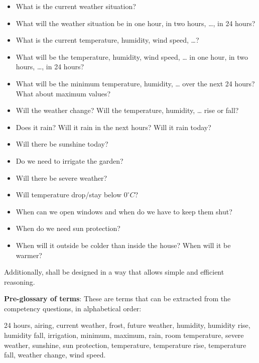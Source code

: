 \begin{mdframed}[linewidth=.6pt]
\begin{itemize}
  \item What is the current weather situation?
  \item What will the weather situation be in one hour, in two hours, …, in 24 hours?
  \item What is the current temperature, humidity, wind speed, …?
  \item What will be the temperature, humidity, wind speed, … in one hour, in two hours, …, in 24 hours?
  \item What will be the minimum temperature, humidity, … over the next 24 hours? What about maximum values?
  \item Will the weather change? Will the temperature, humidity, … rise or fall?
  \item Does it rain? Will it rain in the next hours? Will it rain today?
  \item Will there be sunshine today? 
  \item Do we need to irrigate the garden?
  \item Will there be severe weather?
  \item Will temperature drop/stay below $0^\circ C$?
  \item When can we open windows and when do we have to keep them shut?
  \item When do we need sun protection?
  \item When will it outside be colder than inside the house? When will it be warmer?
\end{itemize}

Additionally, \smarthomeweather shall be designed in a way that allows simple and efficient  reasoning.

\setlength{\leftskip}{0cm}

\vspace{.2cm}

\textbf{Pre-glossary of terms}: These are terms that can be extracted from the competency questions, in alphabetical order:

24 hours, airing, current weather, frost, future weather, humidity, humidity rise, humidity fall, irrigation, minimum, maximum, rain, room temperature, severe weather, sunshine, sun protection, temperature, temperature rise, temperature fall, weather change, wind speed.

\setlength{\leftskip}{0cm}

\end{mdframed}

